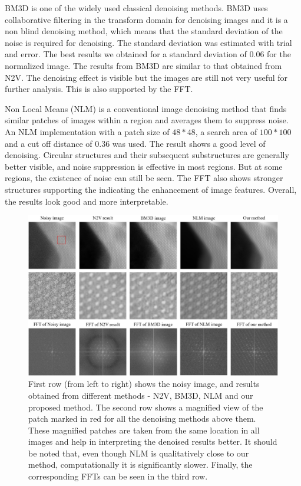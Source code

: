 \documentclass[fleqn,10pt]{wlscirep}
\begin{document}
	BM3D \cite{DBLP:journals/tip/BM3D} is one of the widely used classical denoising methods. BM3D uses collaborative filtering in the transform domain for denoising images and it is a non blind denoising method, which means that the standard deviation of the noise is required for denoising. The standard deviation was estimated with trial and error. The best results we obtained for a standard deviation of 0.06 for the normalized image. The results from BM3D are similar to that obtained from N2V. The denoising effect is visible but the images are still not very useful for further analysis. This is also supported by the FFT.
	
		
	Non Local Means (NLM) \cite{bcm_nlm} is a conventional image denoising method that finds similar patches of images within a region and averages them to suppress noise. An NLM implementation with a patch size of $48*48$, a search area of $100*100$ and a cut off distance of 0.36 was used. The result shows a good level of denoising. Circular structures and their subsequent substructures are generally better visible, and noise suppression is effective in most regions. But at some regions, the existence of noise can still be seen. The FFT also shows stronger structures supporting the indicating the enhancement of image features. Overall, the results look good and more interpretable. 
	
	\begin{figure}[H]
		\centering
		\includegraphics[scale=0.4]{./imgs/comparison-zoomed.jpg}
		\caption{First row (from left to right) shows the noisy image, and results obtained from different methods - N2V, BM3D, NLM and our proposed method. The second row shows a magnified view of the patch marked in red for all the denoising methods above them. These magnified patches are taken from the same location in all images and help in interpreting the denoised results better. It should be noted that, even though NLM is qualitatively close to our method, computationally it is significantly slower. Finally, the corresponding FFTs can be seen in the third row.  }
		\label{fig:comparison}
	\end{figure}
		
\end{document}
